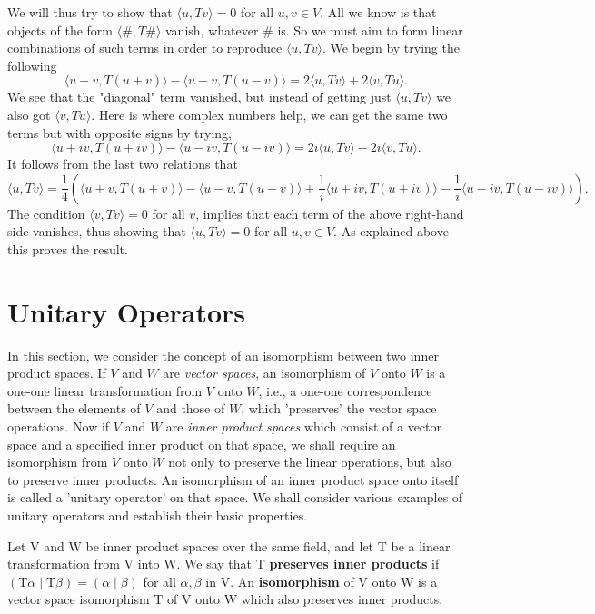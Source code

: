 \documentclass[main.tex]{subfiles}
\begin{document}
We will thus try to show that $\langle u, T v\rangle=0$ for all $u, v \in V$. All we know is that objects of the form $\langle \#, T \#\rangle$ vanish, whatever \# is. So we must aim to form linear combinations of such terms in order to reproduce $\langle u, T v\rangle$. We begin by trying the following
$$
\langle u+v, T(u+v)\rangle-\langle u-v, T(u-v)\rangle=2\langle u, T v\rangle+2\langle v, T u\rangle .
$$
We see that the "diagonal" term vanished, but instead of getting just $\langle u, T v\rangle$ we also got $\langle v, T u\rangle$. Here is where complex numbers help, we can get the same two terms but with opposite signs by trying,
$$
\langle u+i v, T(u+i v)\rangle-\langle u-i v, T(u-i v)\rangle=2 i\langle u, T v\rangle-2 i\langle v, T u\rangle .
$$
It follows from the last two relations that $$
\langle u, T v\rangle=\frac{1}{4}\left(\langle u+v, T(u+v)\rangle-\langle u-v, T(u-v)\rangle+\frac{1}{i}\langle u+i v, T(u+i v)\rangle-\frac{1}{i}\langle u-i v, T(u-i v)\rangle\right) .
$$
The condition $\langle v, T v\rangle=0$ for all $v$, implies that each term of the above right-hand side vanishes, thus showing that $\langle u, T v\rangle=0$ for all $u, v \in V$. As explained above this proves the result.

\section{Unitary Operators}
In this section, we consider the concept of an isomorphism between two inner product spaces. If $V$ and $W$ are \textit{vector spaces}, an isomorphism of $V$ onto $W$ is a one-one linear transformation from $V$ onto $W$, i.e., a one-one correspondence between the elements of $V$ and those of $W$, which 'preserves' the vector space operations. Now if $V$ and $W$ are \textit{inner product spaces} which consist of a vector space and a specified inner product on that space, we shall require an isomorphism from $V$ onto $W$ not only to preserve the linear operations, but also to preserve inner products. An isomorphism of an inner product space onto itself is called a 'unitary operator' on that space. We shall consider various examples of unitary operators and establish their basic properties.

\begin{definition}
Let $\mathrm{V}$ and $\mathrm{W}$ be inner product spaces over the same field, and let $\mathrm{T}$ be a linear transformation from $\mathrm{V}$ into $\mathrm{W}$. We say that $\mathrm{T}$ \textbf{preserves inner products} if $(\mathrm{T} \alpha \mid \mathrm{T} \beta)=(\alpha \mid \beta)$ for all $\alpha, \beta$ in $\mathrm{V}$. An \textbf{isomorphism} of $\mathrm{V}$ onto $\mathrm{W}$ is a vector space isomorphism $\mathrm{T}$ of $\mathrm{V}$ onto $\mathrm{W}$ which also preserves inner products. 
\end{definition}
\end{document}
